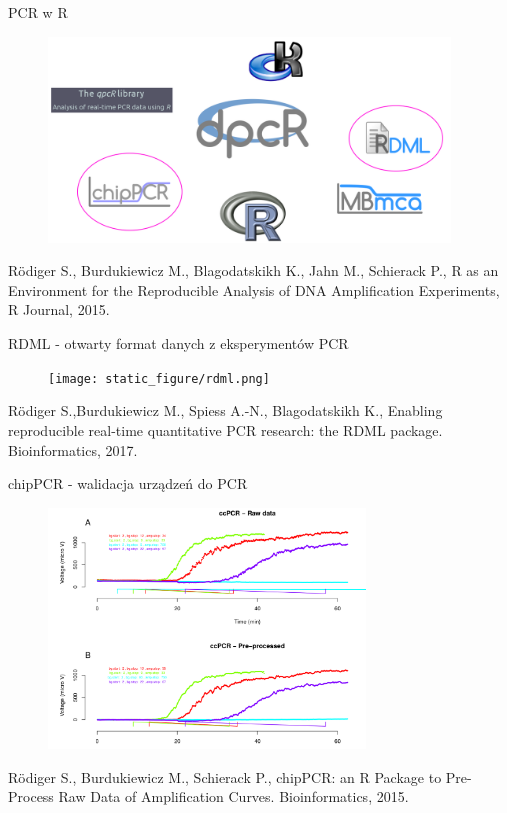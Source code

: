 \documentclass{beamer}\usepackage[]{graphicx}\usepackage[]{color}
\begin{document}
\begin{frame}{PCR w R}
\begin{figure} 
\includegraphics[width=0.95\textwidth]{static_figure/pcr-universum2.png}
\end{figure}

\tiny  R\"{o}diger S., Burdukiewicz M., Blagodatskikh K., Jahn M., 
Schierack P., R as an
Environment for the Reproducible Analysis of DNA Amplification Experiments, 
R Journal, 2015.
\end{frame}

\begin{frame}{RDML - otwarty format danych z eksperymentów PCR}
\begin{figure} 
\texttt{[image: static\_figure/rdml.png]}
\end{figure}

\tiny  R\"{o}diger S.,Burdukiewicz M., Spiess A.-N., Blagodatskikh 
K., Enabling reproducible real-time quantitative PCR research: the RDML 
package. 
Bioinformatics, 2017.

\end{frame}

\begin{frame}{chipPCR - walidacja urządzeń do PCR}
\begin{figure} 
\includegraphics[width=0.75\textwidth]{static_figure/chippcr.png}
\end{figure}

\tiny R\"{o}diger S., Burdukiewicz M., Schierack P., 
chipPCR: an R Package to Pre-Process Raw Data of Amplification Curves. 
Bioinformatics, 2015.

\end{frame}
\end{document}

